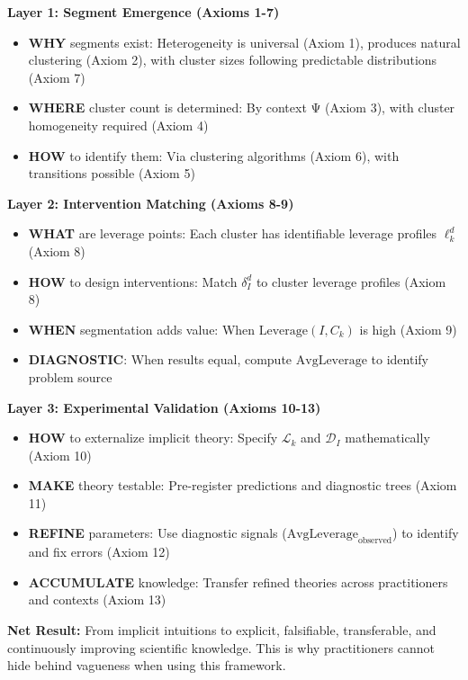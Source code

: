 \begin{tcolorbox}[colback=cyan!10!white, colframe=cyan!75!black,
    title=13-Axiom Hierarchical Framework]

\textbf{Layer 1: Segment Emergence (Axioms 1-7)}
\begin{itemize}[nosep]
\item \textbf{WHY} segments exist: Heterogeneity is universal (Axiom 1), produces natural clustering (Axiom 2), with cluster sizes following predictable distributions (Axiom 7)
\item \textbf{WHERE} cluster count is determined: By context Ψ (Axiom 3), with cluster homogeneity required (Axiom 4)
\item \textbf{HOW} to identify them: Via clustering algorithms (Axiom 6), with transitions possible (Axiom 5)
\end{itemize}

\textbf{Layer 2: Intervention Matching (Axioms 8-9)}
\begin{itemize}[nosep]
\item \textbf{WHAT} are leverage points: Each cluster has identifiable leverage profiles $\ell_k^d$ (Axiom 8)
\item \textbf{HOW} to design interventions: Match $\delta_I^d$ to cluster leverage profiles (Axiom 8)
\item \textbf{WHEN} segmentation adds value: When $\text{Leverage}(I, C_k)$ is high (Axiom 9)
\item \textbf{DIAGNOSTIC}: When results equal, compute $\text{AvgLeverage}$ to identify problem source
\end{itemize}

\textbf{Layer 3: Experimental Validation (Axioms 10-13)}
\begin{itemize}[nosep]
\item \textbf{HOW} to externalize implicit theory: Specify $\mathcal{L}_k$ and $\mathcal{D}_I$ mathematically (Axiom 10)
\item \textbf{MAKE} theory testable: Pre-register predictions and diagnostic trees (Axiom 11)
\item \textbf{REFINE} parameters: Use diagnostic signals ($\text{AvgLeverage}_{\text{observed}}$) to identify and fix errors (Axiom 12)
\item \textbf{ACCUMULATE} knowledge: Transfer refined theories across practitioners and contexts (Axiom 13)
\end{itemize}

\textbf{Net Result:}
From implicit intuitions to explicit, falsifiable, transferable, and continuously improving scientific knowledge.
This is why practitioners cannot hide behind vagueness when using this framework.

\end{tcolorbox}

